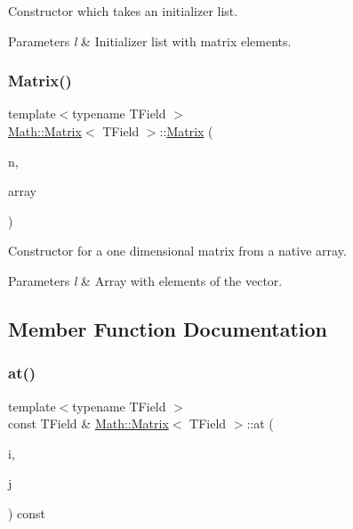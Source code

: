 Constructor which takes an initializer list. 


\begin{DoxyParams}{Parameters}
{\em l} & Initializer list with matrix elements. \\
\hline
\end{DoxyParams}
\mbox{\label{classMath_1_1Matrix_a2b849f680fc4ba0d5b0277f1b3116b81}} 
\subsubsection{\texorpdfstring{Matrix()}{Matrix()}\hspace{0.1cm}{\footnotesize\ttfamily [4/4]}}
{\footnotesize\ttfamily template$<$typename T\+Field $>$ \\
\mbox{\hyperlink{classMath_1_1Matrix}{Math\+::\+Matrix}}$<$ T\+Field $>$\+::\mbox{\hyperlink{classMath_1_1Matrix}{Matrix}} (\begin{DoxyParamCaption}\item[{const int \&}]{n,  }\item[{const T\+Field $\ast$}]{array }\end{DoxyParamCaption})}



Constructor for a one dimensional matrix from a native array. 


\begin{DoxyParams}{Parameters}
{\em l} & Array with elements of the vector. \\
\hline
\end{DoxyParams}


\subsection{Member Function Documentation}
\mbox{\label{classMath_1_1Matrix_a41b0dc600e73ce6efaea25e0d8501496}} 
\subsubsection{\texorpdfstring{at()}{at()}}
{\footnotesize\ttfamily template$<$typename T\+Field $>$ \\
const T\+Field \& \mbox{\hyperlink{classMath_1_1Matrix}{Math\+::\+Matrix}}$<$ T\+Field $>$\+::at (\begin{DoxyParamCaption}\item[{const int \&}]{i,  }\item[{const int \&}]{j }\end{DoxyParamCaption}) const}



